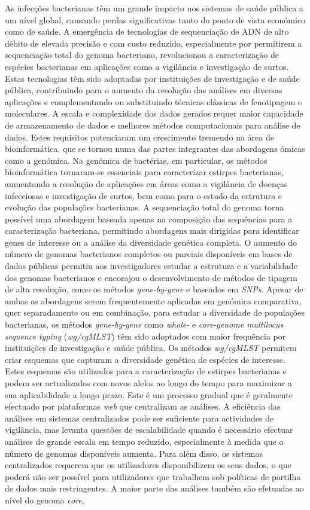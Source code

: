 As infecções bacterianas têm um grande impacto nos sistemas de saúde pública a um nível global, causando perdas significativas tanto do ponto de vista económico como de saúde. A emergência de tecnologias de sequenciação de ADN de alto débito de elevada precisão e com custo reduzido, especialmente por permitirem a sequenciação total do genoma bacteriano, revolucionou a caracterização de espécies bacterianas em aplicações como a vigilância e investigação de surtos. Estas tecnologias têm sido adoptadas por instituições de investigação e de saúde pública, contribuindo para o aumento da resolução das análises em diversas aplicações e complementando ou substituindo técnicas clássicas de fenotipagem e moleculares. A escala e complexidade dos dados gerados requer maior capacidade de armazenamento de dados e melhores métodos computacionais para análise de dados. Estes requisitos potenciaram um crescimento tremendo na área de bioinformática, que se tornou numa das partes integrantes das abordagens ómicas como a genómica. Na genómica de bactérias, em particular, os métodos bioinformática tornaram-se essenciais para caracterizar estirpes bacterianas, aumentando a resolução de aplicações em áreas como a vigilância de doenças infecciosas e investigação de surtos, bem como para o estudo da estrutura e evolução das populações bacterianas. A sequenciação total do genoma torna possível uma abordagem baseada apenas na composição das sequências para a caracterização bacteriana, permitindo abordagens mais dirigidas para identificar genes de interesse ou a análise da diversidade genética completa. O aumento do número de genomas bacterianos completos ou parciais disponíveis em bases de dados públicas permitiu aos investigadores estudar a estrutura e a variabilidade dos genomas bacterianos e encorajou o desenvolvimento de métodos de tipagem de alta resolução, como os métodos \textit{gene-by-gene} e baseados em \textit{SNPs}. Apesar de ambas as abordagens serem frequentemente aplicadas em genómica comparativa, quer separadamente ou em combinação, para estudar a diversidade de populações bacterianas, os métodos \textit{gene-by-gene} como \textit{whole-} e \textit{core-genome multilocus sequence typing} (\textit{wg/cgMLST}) têm sido adoptados com maior frequência por instituições de investigação e saúde pública. Os métodos \textit{wg/cgMLST} permitem criar esquemas que capturam a diversidade genética de espécies de interesse. Estes esquemas são utilizados para a caracterização de estirpes bacterianas e podem ser actualizados com novos alelos ao longo do tempo para maximizar a sua aplicabilidade a longo prazo. Este é um processo gradual que é geralmente efectuado por plataformas \textit{web} que centralizam as análises. A eficiência das análises em sistemas centralizados pode ser suficiente para actividades de vigilância, mas levanta questões de escalabilidade quando é necessário efectuar análises de grande escala em tempo reduzido, especialmente à medida que o número de genomas disponíveis aumenta. Para além disso, os sistemas centralizados requerem que os utilizadores disponibilizem os seus dados, o que poderá não ser possível para utilizadores que trabalhem sob políticas de partilha de dados mais restringentes. A maior parte das análises também são efetuadas ao nível do genoma \textit{core}, 
